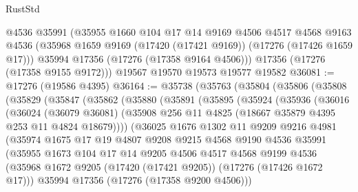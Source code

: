 \begin{lexlean}{RustStd}
\begin{coremodule}
      @4536
      @35991
      (@35955
        @1660
        @104
        @17
        @14
        @9169
        @4506
        @4517
        @4568
        @9163
        @4536
        (@35968 @1659 @9169 (@17420 (@17421 @9169)) (@17276 (@17426 @1659 @17)))
        @35994
        @17356
        (@17276 (@17358 @9164 @4506)))
      @17356
      (@17276 (@17358 @9155 @9172)))
    @19567
    @19570
    @19573
    @19577
    @19582
@36081 := @17276 (@19586 @4395)
@36164 := @35738
    (@35763
      (@35804
        (@35806
          (@35808
            (@35829
              (@35847
                (@35862
                  (@35880
                    (@35891
                      (@35895
                        (@35924
                          (@35936
                            (@36016
                              (@36024
                                (@36079 @36081)
                                (@35908
                                  @256
                                  @11
                                  @4825
                                  (@18667 @35879 @4395 @253 @11 @4824 @18679))))
                            (@36025
                              @1676
                              @1302
                              @11
                              @9209
                              @9216
                              @4981
                              (@35974
                                @1675
                                @17
                                @19
                                @4807
                                @9208
                                @9215
                                @4568
                                @9190
                                @4536
                                @35991
                                (@35955
                                  @1673
                                  @104
                                  @17
                                  @14
                                  @9205
                                  @4506
                                  @4517
                                  @4568
                                  @9199
                                  @4536
                                  (@35968
                                    @1672
                                    @9205
                                    (@17420 (@17421 @9205))
                                    (@17276 (@17426 @1672 @17)))
                                  @35994
                                  @17356
                                  (@17276 (@17358 @9200 @4506)))

\end{coremodule}
\end{lexlean}
